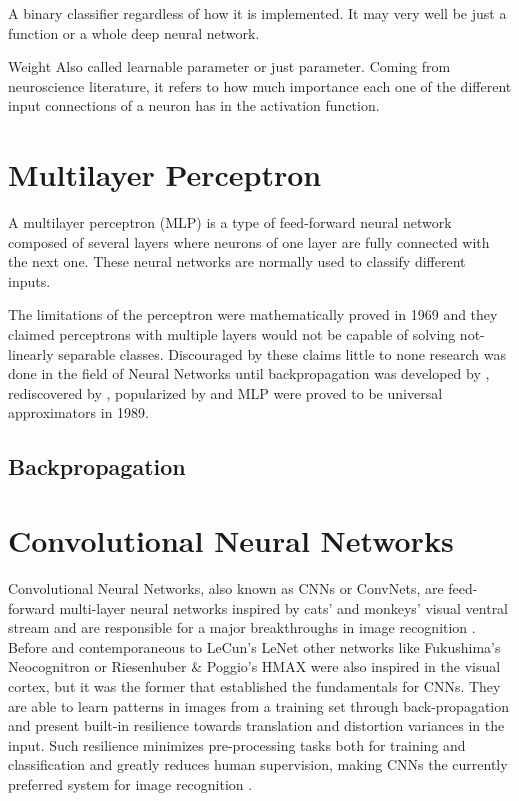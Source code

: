 A binary classifier regardless of how it is implemented. It may very well be just a function or a whole deep neural network.

Weight
Also called learnable parameter or just parameter.
Coming from neuroscience literature, it refers to how much importance each one of the different input connections of a neuron has in the activation function.
\todo[inline]



\section{Multilayer Perceptron}
\label{sec:theory:mlp}
A multilayer perceptron (MLP) is a type of feed-forward neural network composed of several layers where neurons of one layer are fully connected with the next one.
These neural networks are normally used to classify different inputs.

The limitations of the perceptron were mathematically proved \citet{Minsky1969} in 1969 and they claimed perceptrons with multiple layers would not be capable of solving not-linearly separable classes.
Discouraged by these claims little to none research was done in the field of Neural Networks until backpropagation was developed by \citet{Werbos1974}, rediscovered by \citet{Parker1985}, popularized by \citet{Rumelhart1988} and MLP were proved to be universal approximators \cite{Hornik1989,Ruck1990} in 1989.


\subsection{Backpropagation}
\label{sec:theory:mlp:backpropagation}
\todo[inline]



\section{Convolutional Neural Networks}
\label{sec:theory:convnets}
Convolutional Neural Networks, also known as CNNs or ConvNets, are feed-forward multi-layer neural networks inspired by cats' and monkeys' visual ventral stream \cite{Hubel1968,Lawrence1997} and are responsible for a major breakthroughs in image recognition \cite{LeCun1995}.
Before and contemporaneous to LeCun's LeNet \cite{LeCun1998} other networks like Fukushima's Neocognitron \cite{Fukushima1980} or Riesenhuber \& Poggio's HMAX \cite{Riesenhuber1999} were also inspired in the visual cortex, but it was the former that established the fundamentals for CNNs.
They are able to learn patterns in images from a training set through back-propagation and present built-in resilience towards translation and distortion variances in the input.
Such resilience minimizes pre-processing tasks both for training and classification and greatly reduces human supervision, making CNNs the currently preferred system for image recognition \cite{Visin2015}.

